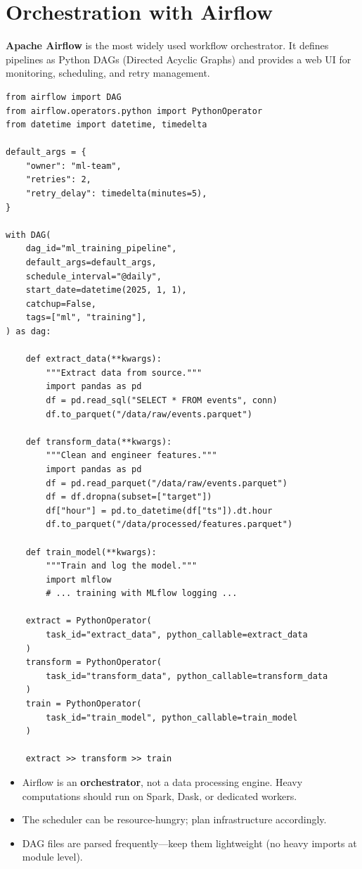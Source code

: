 \section{Orchestration with Airflow}
\label{sec:airflow}

\textbf{Apache Airflow} is the most widely used workflow
orchestrator. It defines pipelines as Python DAGs (Directed Acyclic Graphs)
and provides a web UI for monitoring, scheduling, and retry management.

\begin{codeblock}[title=\textbf{Airflow DAG for an ML pipeline}]
\begin{verbatim}
from airflow import DAG
from airflow.operators.python import PythonOperator
from datetime import datetime, timedelta

default_args = {
    "owner": "ml-team",
    "retries": 2,
    "retry_delay": timedelta(minutes=5),
}

with DAG(
    dag_id="ml_training_pipeline",
    default_args=default_args,
    schedule_interval="@daily",
    start_date=datetime(2025, 1, 1),
    catchup=False,
    tags=["ml", "training"],
) as dag:

    def extract_data(**kwargs):
        """Extract data from source."""
        import pandas as pd
        df = pd.read_sql("SELECT * FROM events", conn)
        df.to_parquet("/data/raw/events.parquet")

    def transform_data(**kwargs):
        """Clean and engineer features."""
        import pandas as pd
        df = pd.read_parquet("/data/raw/events.parquet")
        df = df.dropna(subset=["target"])
        df["hour"] = pd.to_datetime(df["ts"]).dt.hour
        df.to_parquet("/data/processed/features.parquet")

    def train_model(**kwargs):
        """Train and log the model."""
        import mlflow
        # ... training with MLflow logging ...

    extract = PythonOperator(
        task_id="extract_data", python_callable=extract_data
    )
    transform = PythonOperator(
        task_id="transform_data", python_callable=transform_data
    )
    train = PythonOperator(
        task_id="train_model", python_callable=train_model
    )

    extract >> transform >> train
\end{verbatim}
\end{codeblock}

\begin{warning}[title=\textbf{Airflow pitfalls}]
\begin{itemize}
  \item Airflow is an \textbf{orchestrator}, not a data processing engine.
    Heavy computations should run on Spark, Dask, or dedicated workers.
  \item The scheduler can be resource-hungry; plan infrastructure
    accordingly.
  \item DAG files are parsed frequently---keep them lightweight (no heavy
    imports at module level).
\end{itemize}
\end{warning}

